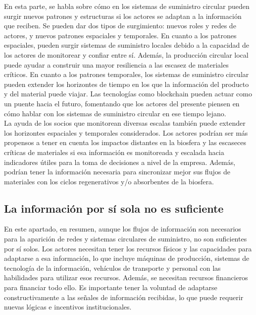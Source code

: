 \documentclass[runningheads]{llncs}
\begin{document}
En esta parte, se habla sobre cómo en los sistemas de suministro
circular pueden surgir nuevos patrones y estructuras si los actores se
adaptan a la información que reciben. Se pueden dar dos tipos de
surgimiento: nuevos roles y redes de actores, y nuevos patrones
espaciales y temporales. En cuanto a los patrones espaciales, pueden
surgir sistemas de suministro locales debido a la capacidad de los
actores de monitorear y confiar entre sí. Además, la producción circular
local puede ayudar a construir una mayor resiliencia a las escasez de
materiales críticos. En cuanto a los patrones temporales, los sistemas
de suministro circular pueden extender los horizontes de tiempo en los
que la información del producto y del material puede viajar. Las
tecnologías como blockchain pueden actuar como un puente hacia el
futuro, fomentando que los actores del presente piensen en cómo hablar
con los sistemas de suministro circular en ese tiempo lejano.\\

La ayuda de los socios que monitorean diversas escalas también puede
extender los horizontes espaciales y temporales considerados. Los
actores podrían ser más propensos a tener en cuenta los impactos
distantes en la biosfera y las escaseces críticas de materiales si esa
información es monitoreada y escalada hacia indicadores útiles para la
toma de decisiones a nivel de la empresa. Además, podrían tener la
información necesaria para sincronizar mejor sus flujos de materiales
con los ciclos regenerativos y/o absorbentes de la biosfera.

\hypertarget{la-informaciuxf3n-por-suxed-sola-no-es-suficiente}{%
\subsection{La información por sí sola no es
suficiente}\label{la-informaciuxf3n-por-suxed-sola-no-es-suficiente}}

En este apartado, en resumen, aunque los flujos de información son
necesarios para la aparición de redes y sistemas circulares de
suministro, no son suficientes por sí solos. Los actores necesitan tener
los recursos físicos y las capacidades para adaptarse a esa información,
lo que incluye máquinas de producción, sistemas de tecnología de la
información, vehículos de transporte y personal con las habilidades para
utilizar esos recursos. Además, se necesitan recursos financieros para
financiar todo ello. Es importante tener la voluntad de adaptarse
constructivamente a las señales de información recibidas, lo que puede
requerir nuevas lógicas e incentivos institucionales.
\end{document}
